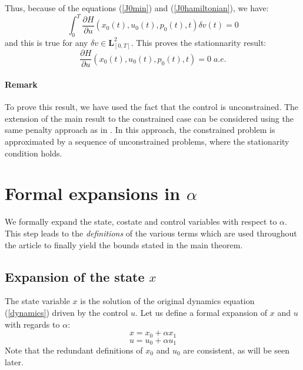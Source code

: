 \documentclass[a4paper,10pt]{article}
\begin{document}
Thus, because of the equations (\ref{J0min}) and 
(\ref{J0hamiltonian}), we have:
\[
   \int_{0}^{T} \frac{\partial H}{\partial u}(x_{0}(t),u_{0}(t),p_{0}(t),t) \delta v(t)  =0
\]
and this is true for any $\delta v \in \mathbf{L}_{[0,T]}^2$.
This proves the stationnarity result:
\[
 \frac{\partial H}{\partial u}(x_{0}(t),u_{0}(t),p_{0}(t),t)  = 0 \; a.e.
\]
\paragraph{Remark} To prove this result, we have used the fact that 
the control is unconstrained. The extension of the main result to the 
constrained case can be considered using the same penalty approach as 
in \cite{maamria}. In this approach, the constrained problem is 
approximated by a sequence of unconstrained problems, where the 
stationarity condition holds.

\section{Formal expansions in $\alpha$}\label{FormalExp}
We formally expand the state, costate and control variables with 
respect to $\alpha$. This step leads to the {\em definitions} of the various 
terms which are used throughout the article to finally yield the 
bounds stated in the main theorem.
\subsection{Expansion of the state $x$}
The state variable $x$ is the solution of the original dynamics 
equation (\ref{dynamics}) driven by the control $u$. Let us define a 
formal expansion of $x$ and $u$ with regards to $\alpha$:
\begin{equation}
        x = x_{0} + \alpha x_{1} 
    \label{statedev}
\end{equation}
\begin{equation}
        u = u_{0} + \alpha u_{1}
    \label{controldev}
\end{equation}
Note that the redundant definitions of $x_{0}$ and $u_{0}$ are consistent, as will 
be seen later.
\end{document}
